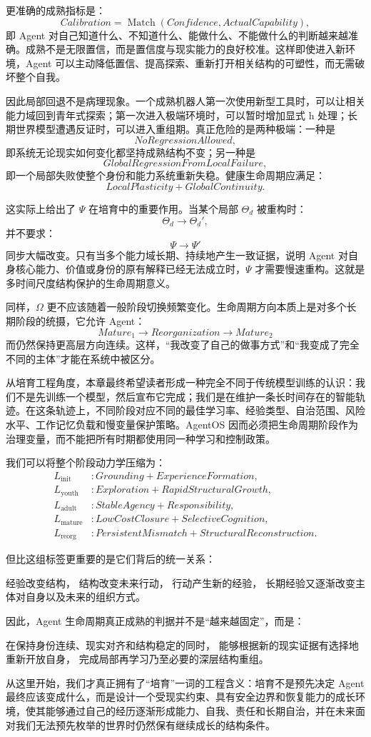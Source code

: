 更准确的成熟指标是：
\[
Calibration
=
\operatorname{Match}
(
Confidence,
ActualCapability
),
\]
即 Agent 对自己知道什么、不知道什么、能做什么、不能做什么的判断越来越准确。成熟不是无限置信，而是置信度与现实能力的良好校准。这样即使进入新环境，Agent 可以主动降低置信、提高探索、重新打开相关结构的可塑性，而无需破坏整个自我。

因此局部回退不是病理现象。一个成熟机器人第一次使用新型工具时，可以让相关能力域回到青年式探索；第一次进入极端环境时，可以暂时增加显式 h 处理；长期世界模型遭遇反证时，可以进入重组期。真正危险的是两种极端：一种是
\[
NoRegressionAllowed,
\]
即系统无论现实如何变化都坚持成熟结构不变；另一种是
\[
GlobalRegressionFromLocalFailure,
\]
即一个局部失败使整个身份和能力系统重新失稳。健康生命周期应满足：
\[
\boxed{
LocalPlasticity
+
GlobalContinuity.
}
\]

这实际上给出了 $\Psi$ 在培育中的重要作用。当某个局部 $\Theta_d$ 被重构时：
\[
\Theta_d
\rightarrow
\Theta_d',
\]
并不要求：
\[
\Psi
\rightarrow
\Psi'
\]
同步大幅改变。只有当多个能力域长期、持续地产生一致证据，说明 Agent 对自身核心能力、价值或身份的原有解释已经无法成立时，$\Psi$ 才需要慢速重构。这就是多时间尺度结构保护的生命周期意义。

同样，$\Omega$ 更不应该随着一般阶段切换频繁变化。生命周期方向本质上是对多个长期阶段的统摄，它允许 Agent：
\[
Mature_1
\rightarrow
Reorganization
\rightarrow
Mature_2
\]
而仍然保持更高层方向连续。这样，“我改变了自己的做事方式”和“我变成了完全不同的主体”才能在系统中被区分。

从培育工程角度，本章最终希望读者形成一种完全不同于传统模型训练的认识：我们不是先训练一个模型，然后宣布它完成；我们是在维护一条长时间存在的智能轨迹。在这条轨迹上，不同阶段对应不同的最佳学习率、经验类型、自治范围、风险水平、工作记忆负载和慢变量保护策略。AgentOS 因而必须把生命周期阶段作为治理变量，而不能把所有时期都使用同一种学习和控制政策。

我们可以将整个阶段动力学压缩为：
\[
\boxed{
\begin{aligned}
L_{\mathrm{init}}
&:
Grounding+ExperienceFormation,
\\
L_{\mathrm{youth}}
&:
Exploration+RapidStructuralGrowth,
\\
L_{\mathrm{adult}}
&:
StableAgency+Responsibility,
\\
L_{\mathrm{mature}}
&:
LowCostClosure+SelectiveCognition,
\\
L_{\mathrm{reorg}}
&:
PersistentMismatch+StructuralReconstruction.
\end{aligned}
}
\]

但比这组标签更重要的是它们背后的统一关系：
\begin{statementbox}
经验改变结构，
结构改变未来行动，
行动产生新的经验，
长期经验又逐渐改变主体对自身以及未来的组织方式。
\end{statementbox}

因此，Agent 生命周期真正成熟的判据并不是“越来越固定”，而是：

\begin{statementbox}
在保持身份连续、现实对齐和结构稳定的同时，
能够根据新的现实证据有选择地重新开放自身，
完成局部再学习乃至必要的深层结构重组。
\end{statementbox}

从这里开始，我们才真正拥有了“培育”一词的工程含义：培育不是预先决定 Agent 最终应该变成什么，而是设计一个受现实约束、具有安全边界和恢复能力的成长环境，使其能够通过自己的经历逐渐形成能力、自我、责任和长期自治，并在未来面对我们无法预先枚举的世界时仍然保有继续成长的结构条件。
